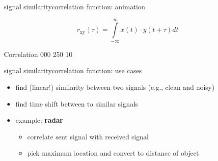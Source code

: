 \begin{frame}{signal similarity}{correlation function: animation}
    \vspace{-5mm}
    \begin{footnotesize}
    \begin{equation*}
        r_\mathrm{xy}(\tau) = \int\limits_{-\infty}^{\infty}{x(t)\cdot y(t+\tau)}dt
    \end{equation*}
    \end{footnotesize}
        {Correlation}
        {000}
        {250}
        {10}
\end{frame}

\begin{frame}{signal similarity}{correlation function: use cases}
    \begin{itemize}
        \item   find (linear!) similarity between two signals (e.g., clean and noisy)
        \item   find time shift between to similar signals
        \bigskip
        \item<2->   example: \textbf{radar}
            \begin{itemize}
                \item   correlate sent signal with received signal
                \item   pick maximum location and convert to distance of object
            \end{itemize}
    \end{itemize}
\end{frame}

